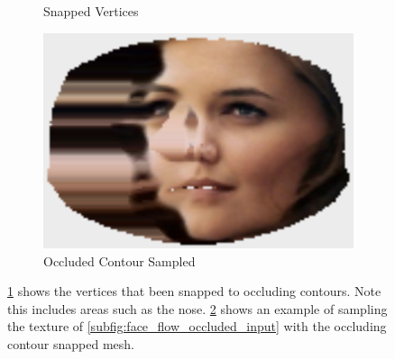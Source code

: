 \begin{figure}[t]
\begin{subfigure}[b]{0.23\textwidth}
        \caption{Snapped Vertices}\label{subfig:face_flow_snapped_contour}
    \end{subfigure} \hfill
    \begin{subfigure}[b]{0.4\textwidth}
        \centering
        \includegraphics[width=\textwidth]{face_flow/images/contour_snapping/sampled_snapping}
        \caption{Occluded Contour Sampled}\label{subfig:face_flow_snapped_sampling}
    \end{subfigure}
    \hspace*{\fill}
    \caption{\cref{subfig:face_flow_snapped_contour} shows the vertices that
             been snapped to occluding contours. Note this includes areas such
             as the nose. \cref{subfig:face_flow_snapped_sampling} shows an
             example of sampling the texture of
             \cref{subfig:face_flow_occluded_input} with the occluding contour
             snapped mesh.}
\label{fig:face_flow_snapping_example}
\end{figure}
